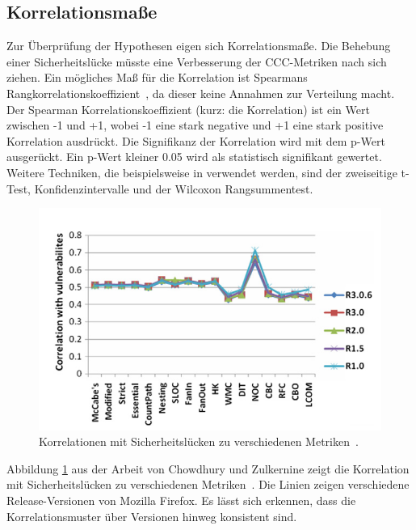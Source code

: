 \subsection{Korrelationsmaße}
Zur Überprüfung der Hypothesen eigen sich Korrelationsmaße.
Die Behebung einer Sicherheitslücke müsste eine Verbesserung der CCC-Metriken nach sich ziehen.
Ein mögliches Maß für die Korrelation ist Spearmans Rangkorrelationskoeffizient~\cite{alves_et_al,chowdhury_zulkernine_2010}, da dieser keine Annahmen zur Verteilung macht.
Der Spearman Korrelationskoeffizient (kurz: die Korrelation) ist ein Wert zwischen -1 und +1, wobei -1 eine stark negative und +1 eine stark positive Korrelation ausdrückt.
Die Signifikanz der Korrelation wird mit dem p-Wert ausgerückt.
Ein p-Wert kleiner 0.05 wird als statistisch signifikant gewertet.
Weitere Techniken, die beispielsweise in \cite{alves_et_al} verwendet werden, sind der zweiseitige t-Test, Konfidenzintervalle und der Wilcoxon Rangsummentest.
\begin{figure}
	\includegraphics[width=\textwidth]{img/vulnerability_correlations.png}
	\caption{Korrelationen mit Sicherheitslücken zu verschiedenen Metriken~\cite{chowdhury_zulkernine_2009}.}
	\label{fig:correlations}
\end{figure}
Abbildung \ref{fig:correlations} aus der Arbeit von Chowdhury und Zulkernine zeigt die Korrelation mit Sicherheitslücken zu verschiedenen Metriken~\cite{chowdhury_zulkernine_2009}.
Die Linien zeigen verschiedene Release-Versionen von Mozilla Firefox.
Es lässt sich erkennen, dass die Korrelationsmuster über Versionen hinweg konsistent sind\cite{chowdhury_zulkernine_2009}.

